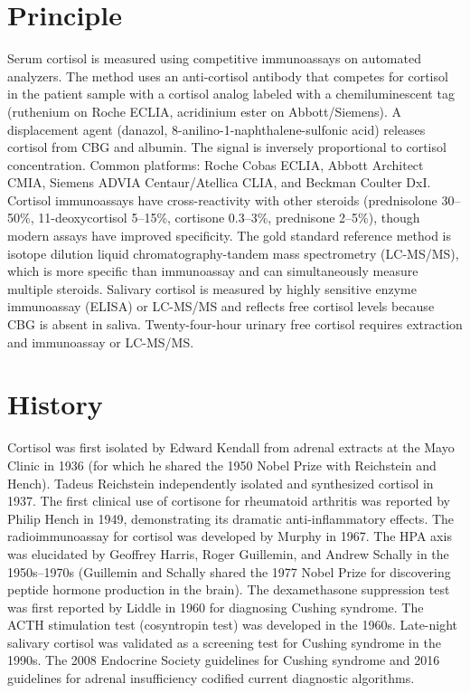 \section*{Principle}
Serum cortisol is measured using competitive immunoassays on automated analyzers. The method uses an anti-cortisol antibody that competes for cortisol in the patient sample with a cortisol analog labeled with a chemiluminescent tag (ruthenium on Roche ECLIA, acridinium ester on Abbott/Siemens). A displacement agent (danazol, 8-anilino-1-naphthalene-sulfonic acid) releases cortisol from CBG and albumin. The signal is inversely proportional to cortisol concentration. Common platforms: Roche Cobas ECLIA, Abbott Architect CMIA, Siemens ADVIA Centaur/Atellica CLIA, and Beckman Coulter DxI. Cortisol immunoassays have cross-reactivity with other steroids (prednisolone 30--50\%, 11-deoxycortisol 5--15\%, cortisone 0.3--3\%, prednisone 2--5\%), though modern assays have improved specificity. The gold standard reference method is isotope dilution liquid chromatography-tandem mass spectrometry (LC-MS/MS), which is more specific than immunoassay and can simultaneously measure multiple steroids. Salivary cortisol is measured by highly sensitive enzyme immunoassay (ELISA) or LC-MS/MS and reflects free cortisol levels because CBG is absent in saliva. Twenty-four-hour urinary free cortisol requires extraction and immunoassay or LC-MS/MS.

\section*{History}
Cortisol was first isolated by Edward Kendall from adrenal extracts at the Mayo Clinic in 1936 (for which he shared the 1950 Nobel Prize with Reichstein and Hench). Tadeus Reichstein independently isolated and synthesized cortisol in 1937. The first clinical use of cortisone for rheumatoid arthritis was reported by Philip Hench in 1949, demonstrating its dramatic anti-inflammatory effects. The radioimmunoassay for cortisol was developed by Murphy in 1967. The HPA axis was elucidated by Geoffrey Harris, Roger Guillemin, and Andrew Schally in the 1950s--1970s (Guillemin and Schally shared the 1977 Nobel Prize for discovering peptide hormone production in the brain). The dexamethasone suppression test was first reported by Liddle in 1960 for diagnosing Cushing syndrome. The ACTH stimulation test (cosyntropin test) was developed in the 1960s. Late-night salivary cortisol was validated as a screening test for Cushing syndrome in the 1990s. The 2008 Endocrine Society guidelines for Cushing syndrome and 2016 guidelines for adrenal insufficiency codified current diagnostic algorithms.

